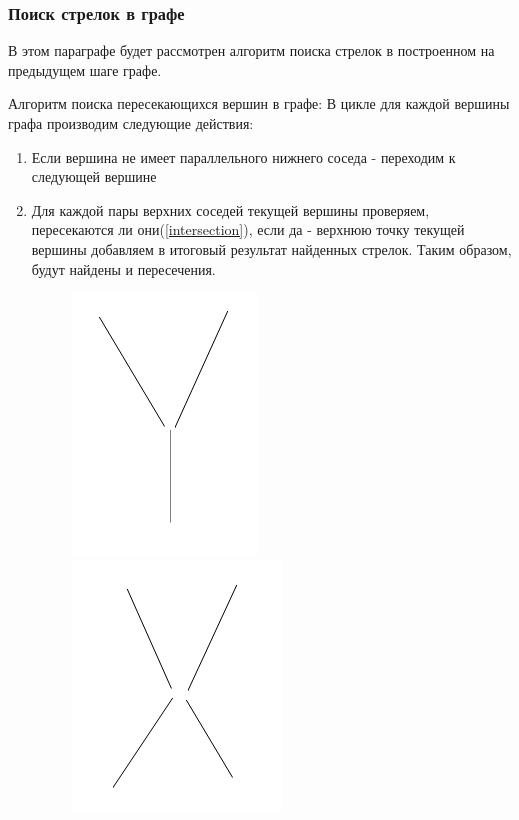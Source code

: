 \subsubsection{Поиск стрелок в графе}

В этом параграфе будет рассмотрен алгоритм поиска стрелок в построенном на предыдущем шаге графе. 

Алгоритм поиска пересекающихся вершин в графе: \newline
В цикле для каждой вершины графа производим следующие действия:
\begin{enumerate}
	\item Если вершина не имеет параллельного нижнего соседа - переходим к следующей вершине
	\item Для каждой пары верхних соседей текущей вершины проверяем, пересекаются ли они(\ref{intersection}), если да - верхнюю точку текущей вершины добавляем в итоговый результат найденных стрелок. Таким образом, будут найдены  и  пересечения.
	\begin{figure}[!h]
		\centering
		\begin{minipage}{0.45\textwidth}
			\centering
			\includegraphics[width=0.7\linewidth,height=0.7\linewidth]{pictures/Y_cross}
			\caption[Y]{}
			\label{fig:ycross}
		\end{minipage}
		\begin{minipage}{0.45\textwidth}
			\centering
			\includegraphics[width=0.7\linewidth,height=0.7\linewidth]{pictures/X_cross}

\end{minipage}
\end{figure}
\end{enumerate}
